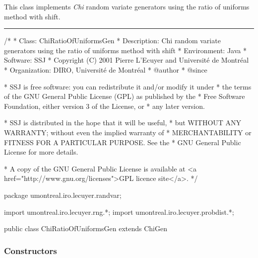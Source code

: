
This class implements {\em Chi\/} random variate generators using
 the ratio of uniforms method with shift.


\bigskip\hrule

\begin{code}
\begin{hide}
/*
 * Class:        ChiRatioOfUniformsGen
 * Description:  Chi random variate generators using the ratio of uniforms
                 method with shift
 * Environment:  Java
 * Software:     SSJ 
 * Copyright (C) 2001  Pierre L'Ecuyer and Université de Montréal
 * Organization: DIRO, Université de Montréal
 * @author       
 * @since

 * SSJ is free software: you can redistribute it and/or modify it under
 * the terms of the GNU General Public License (GPL) as published by the
 * Free Software Foundation, either version 3 of the License, or
 * any later version.

 * SSJ is distributed in the hope that it will be useful,
 * but WITHOUT ANY WARRANTY; without even the implied warranty of
 * MERCHANTABILITY or FITNESS FOR A PARTICULAR PURPOSE.  See the
 * GNU General Public License for more details.

 * A copy of the GNU General Public License is available at
   <a href="http://www.gnu.org/licenses">GPL licence site</a>.
 */
\end{hide}
package umontreal.iro.lecuyer.randvar;\begin{hide}
import umontreal.iro.lecuyer.rng.*;
import umontreal.iro.lecuyer.probdist.*;
\end{hide}

public class ChiRatioOfUniformsGen extends ChiGen \begin{hide} {

\end{hide}
\end{code}

\subsubsection* {Constructors}

